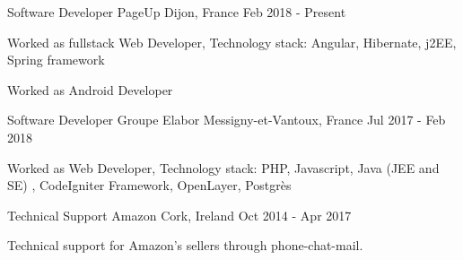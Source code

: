 

\begin{cventries}

  \cventry
    {Software Developer} %
    {PageUp} %
    {Dijon, France} %
    {Feb 2018 - Present} %
    {
      \begin{cvitems} %
        \item {Worked as fullstack Web Developer, Technology stack:  Angular, Hibernate, j2EE, Spring framework }
        \item {Worked as Android Developer }
      \end{cvitems}
    }

  \cventry
    {Software Developer} %
    {Groupe Elabor} %
    {Messigny-et-Vantoux, France} %
    { Jul 2017 - Feb 2018} %
    {
      \begin{cvitems} %
        \item {Worked as Web Developer, Technology stack: PHP,  Javascript, Java (JEE and SE) , CodeIgniter Framework,  OpenLayer, Postgrès}
      \end{cvitems}
    }
  \cventry
    {Technical Support} %
    {Amazon} %
    {Cork, Ireland} %
    { Oct 2014 - Apr 2017} %
    {
      \begin{cvitems} %
        \item {Technical support for Amazon's sellers through phone-chat-mail. }
      \end{cvitems}
    }
    

\end{cventries}
